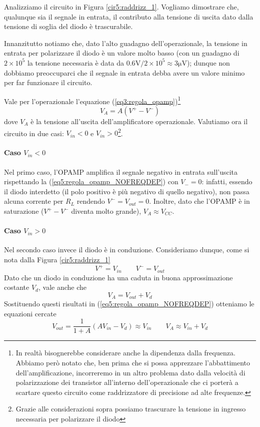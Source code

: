 Analizziamo il circuito in Figura \ref{cir5:raddrizz_1}. Vogliamo dimostrare che, qualunque sia il segnale in entrata, il contributo alla tensione di uscita dato dalla tensione di soglia del diodo è trascurabile.

Innanzitutto notiamo che, dato l'alto guadagno dell'operazionale, la tensione in entrata per polarizzare il diodo è un valore molto basso (con un guadagno di $2\times 10^5$ la tensione necessaria è data da $0.6 \si{\volt}/2\times 10^5 \approx 3 \si{\micro\volt}$); dunque non dobbiamo preoccuparci che il segnale in entrata debba avere un valore minimo per far funzionare il circuito.

Vale per l'operazionale l'equazione (\ref{eq3:regola_opamp})\footnote{In realtà bisognerebbe considerare anche la dipendenza dalla frequenza. Abbiamo però notato che, ben prima che si possa apprezzare l'abbattimento dell'amplificazione, incorreremo in un altro problema dato dalla velocità di polarizzazione dei transistor all'interno dell'operazionale che ci porterà a scartare questo circuito come raddrizzatore di precisione ad alte frequenze.}
\begin{equation}
V_{A}=A (V^+-V^-)
\label{eq5:regola_opamp_NOFREQDEP}
\end{equation}
dove $V_{A}$ è la tensione all'uscita dell'amplificatore operazionale.
Valutiamo ora il circuito in due casi: $V_{in}<0$ e $V_{in}>0$\footnote{Grazie alle considerazioni sopra possiamo trascurare la tensione in ingresso necessaria per polarizzare il diodo}.

\paragraph*{Caso $V_{in}<0$}

Nel primo caso, l'OPAMP amplifica il segnale negativo in entrata sull'uscita rispettando la (\ref{eq5:regola_opamp_NOFREQDEP}) con $V_-=0$: infatti, essendo il diodo interdetto (il polo positivo è più negativo di quello negativo), non passa alcuna corrente per $R_L$ rendendo $V^-=V_{out}=0$. Inoltre, dato che l'OPAMP è in saturazione ($V^+-V^-$ diventa molto grande), $V_A \approx V_{CC}$.

\paragraph*{Caso $V_{in}>0$}

Nel secondo caso invece il diodo è in conduzione. Consideriamo dunque, come si nota dalla Figura \ref{cir5:raddrizz_1}
$$V^+=V_{in} \qquad V^-=V_{out}$$
Dato che un diodo in conduzione ha una caduta in buona approssimazione costante $V_d$, vale anche che
$$V_{A}=V_{out}+V_d$$
Sostituendo questi risultati in (\ref{eq5:regola_opamp_NOFREQDEP}) otteniamo le equazioni cercate
\begin{equation}
V_{out}=\frac{1}{1+A} (A V_{in} - V_d) \approx V_{in} \qquad V_{A} \approx V_{in}+V_d
\label{eq5:leggi_1.1}
\end{equation}


